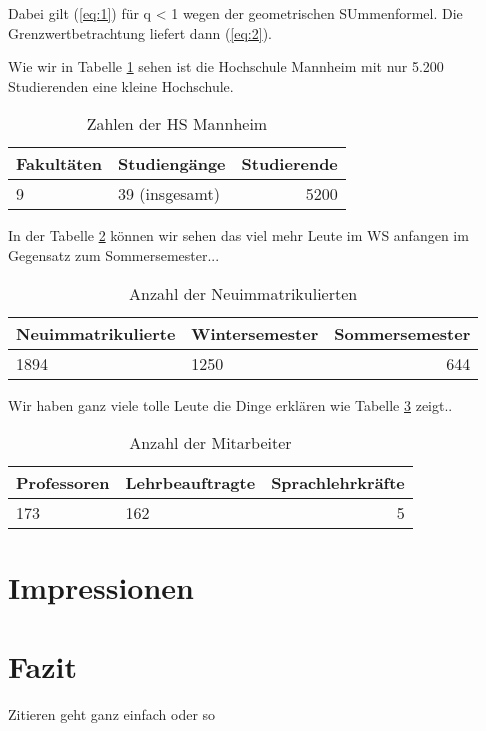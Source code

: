 \documentclass[11pt,a4paper]{article}
\begin{document}
Dabei gilt (\ref{eq:1}) für q < 1 wegen der geometrischen SUmmenformel. Die Grenzwertbetrachtung liefert dann (\ref{eq:2}).

Wie wir in Tabelle \ref{tab:numbers} sehen ist die Hochschule Mannheim mit nur 5.200 Studierenden eine kleine Hochschule.
\begin{table}[H]
\begin{center}
\begin{tabular}{|l|l|r|}
\hline
\textbf{Fakultäten} & \textbf{Studiengänge} & \textbf{Studierende} \\\hline\hline
9 & 39 (insgesamt) & 5200
\\\hline
\end{tabular}
\end{center}
\caption{Zahlen der HS Mannheim}\label{tab:numbers}
\end{table}
In der Tabelle \ref{tab:Neue} können wir  sehen das viel mehr Leute im WS anfangen im Gegensatz zum Sommersemester...

\begin{table}[H]
\begin{center}
\begin{tabular}{|l||l|r|}
\hline
\textbf{Neuimmatrikulierte} & \textbf{Wintersemester} & \textbf{Sommersemester}\\\hline\hline
1894 & 1250 & 644
\\\hline
\end{tabular}
\end{center}
\caption{Anzahl der Neuimmatrikulierten}\label{tab:Neue}
\end{table}
 
 Wir haben ganz viele tolle Leute die Dinge erklären wie Tabelle \ref{tab:Mitarbeiter} zeigt..
\begin{table}[H]
\begin{center}
\begin{tabular}{|l||l|r|}
\hline
\textbf{Professoren} & \textbf{Lehrbeauftragte} & \textbf{Sprachlehrkräfte}\\\hline\hline
173 & 162 & 5
\\\hline
\end{tabular}
\end{center}
\caption{Anzahl der Mitarbeiter}\label{tab:Mitarbeiter}
\end{table}
\section{Impressionen}
\section{Fazit}

Zitieren geht ganz einfach \cite{Beningo} oder so \cite{Lehner}



\end{document}
